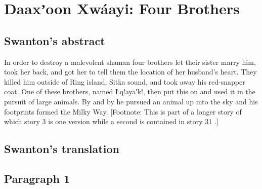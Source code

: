 
\resetexcnt
\chapter{Daaxʼoon Xwáayi: Four Brothers}\label{ch:97-four-brothers}

\section{Swanton’s abstract}\label{sec:97-swanton-abstract}

In order to destroy a malevolent shaman four brothers let their sister marry him, took her back, and got her to tell them the location of her husband’s heart.
They killed him outside of Ring island, Sitka sound, and took away his red-snapper coat.
One of these brothers, named Łq!ayā′k!, then put this on and used it in the pursuit of large animals.
By and by he pursued an animal up into the sky and his footprints formed the Milky Way. [Footnote: This is part of a longer story of which story 3 \parencite[22–25]{swanton:1909} is one version while a second is contained in story 31 \parencite[99–106]{swanton:1909}.]

\section{Swanton’s translation}\label{sec:97-swanton-translation}

\section{Paragraph 1}\label{sec:97-para-1}

